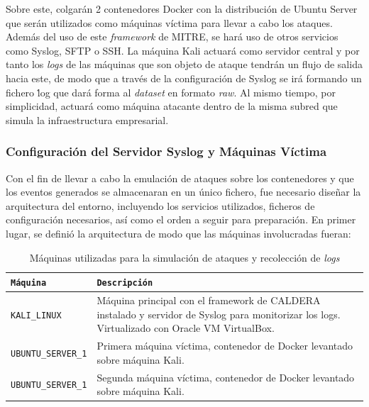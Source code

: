Sobre este, colgarán 2 contenedores Docker con la distribución de Ubuntu Server que serán utilizados como máquinas víctima para llevar a cabo los ataques. Además del uso de este \textit{framework} de MITRE, se hará uso de otros servicios como Syslog, \gls{SFTP} o \gls{SSH}. La máquina Kali actuará como servidor central y por tanto los \textit{logs} de las máquinas que son objeto de ataque tendrán un flujo de salida hacia este, de modo que a través de la configuración de Syslog se irá formando un fichero \.log que dará forma al \textit{dataset} en formato \textit{raw}. Al mismo tiempo, por simplicidad, actuará como máquina atacante dentro de la misma subred que simula la infraestructura empresarial.

\vspace{-2mm}

\subsubsection*{Configuración del Servidor Syslog y Máquinas Víctima}

Con el fin de llevar a cabo la emulación de ataques sobre los contenedores y que los eventos generados se almacenaran en un único fichero, fue necesario diseñar la arquitectura del entorno, incluyendo los servicios utilizados,  ficheros de configuración necesarios, así como el orden a seguir para preparación. En primer lugar, se definió la arquitectura de modo que las máquinas involucradas fueran:

\begin{table}[H]
\footnotesize
\begin{tabularx}{\linewidth}{|l|X|}
    \hline
    \rowcolor{graylight}\texttt{Máquina} & \texttt{Descripción} \\
    \hline
    \texttt{KALI\_LINUX} & Máquina principal con el framework de \gls{CALDERA} instalado y servidor de Syslog para monitorizar los logs. \newline Virtualizado con Oracle \gls{VM} VirtualBox. \\
    \hline
    \texttt{UBUNTU\_SERVER\_1} & Primera máquina víctima, contenedor de Docker levantado sobre máquina Kali. \\
    \hline
    \texttt{UBUNTU\_SERVER\_1} & Segunda máquina víctima, contenedor de Docker levantado sobre máquina Kali. \\
    \hline
\end{tabularx}
\caption{Máquinas utilizadas para la simulación de ataques y recolección de \textit{logs}}
\label{tab:machines}
\end{table}

